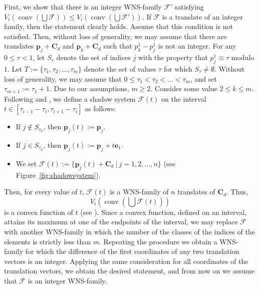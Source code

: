 \documentclass[12pt]{article}
\DeclareMathOperator{\conv}{conv}
\newcommand{\C}{\mathbf{C}}
\newcommand{\e}{\mathbf{e}}
\newcommand{\p}{\mathbf{p}}
\begin{document}
First, we show that there is an integer WNS-family $\mathcal{F}'$ satisfying $V_i\left( \conv \left( \bigcup \mathcal{F}\right) \right) \leq V_i\left( \conv \left( \bigcup \mathcal{F}'\right) \right)$. If $\mathcal{F}$ is a translate of an integer family, then the statement clearly holds. Assume that this condition is not satisfied. Then, without loss of generality, we may assume that there are translates $\p_j + \C_d$ and $\p_k+\C_d$ such that $p_k^1-p_j^1$ is not an integer. For any $0 \leq \tau < 1$, let $S_{\tau}$ denote the set of indices $j$ with the property that $p_j^1 \equiv \tau$ modulo $1$. Let $T:= \{ \tau_1, \tau_2, \ldots, \tau_m \}$ denote the set of values $\tau$ for which $S_\tau \neq \emptyset$. Without loss of generality, we may assume that $0 \leq \tau_1 < \tau_2 < \ldots < \tau_m$, and set $\tau_{m+1}:=\tau_1+1$. Due to our assumptions, $m \geq 2$. Consider some value $2 \leq k \leq m$. Following \cite{RS} and \cite{Shephard}, we define a shadow system $\mathcal{F}(t)$ on the interval $t \in [\tau_{i-1}-\tau_i, \tau_{i+1}-\tau_i]$ as follows:
\begin{itemize}
\item[(1)] If $j \notin S_{\tau_k}$, then $\p_j(t):=\p_j$.
\item[(2)] If $j \in S_{\tau_k}$, then $\p_j(t):= \p_j + t \e_1$.
\item[(3)] We set $\mathcal{F}(t) := \{ \p_j(t)+ \C_d \ |\  j=1,2,\ldots, n \}$ (see Figure~\ref{fig:shadowsystem}).
\end{itemize}
Then, for every value of $t$, $\mathcal{F}(t)$ is a WNS-family of $n$ translates of $\C_d$. Thus, $$V_i\left( \conv \left( \bigcup \mathcal{F}(t)\right) \right)$$ is a convex function of $t$ (see \cite{Shephard}). Since a convex function, defined on an interval, attains its maximum at one of the endpoints of the interval, we may replace $\mathcal{F}$ with another WNS-family in which the number of the classes of the indices of the elements is strictly less than $m$. Repeating the procedure we obtain a WNS-family for which the difference of the first coordinates of any two translation vectors is an integer. Applying the same consideration for all coordinates of the translation vectors, we obtain the desired statement, and from now on we assume that $\mathcal{F}$ is an integer WNS-family.
\end{document}
